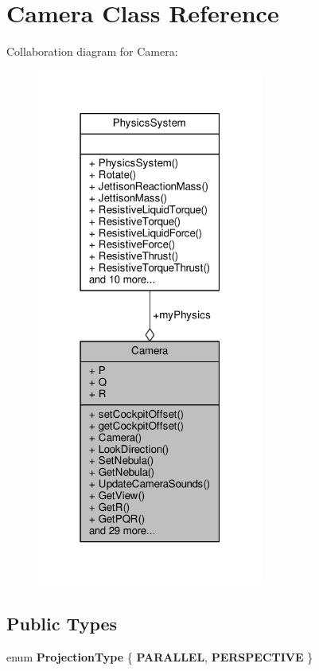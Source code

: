 \hypertarget{classCamera}{}\section{Camera Class Reference}
\label{classCamera}


Collaboration diagram for Camera\+:
\nopagebreak
\begin{figure}[H]
\begin{center}
\leavevmode
\includegraphics[width=211pt]{d4/ddb/classCamera__coll__graph}
\end{center}
\end{figure}
\subsection*{Public Types}
\begin{DoxyCompactItemize}
\item 
enum {\bfseries Projection\+Type} \{ {\bfseries P\+A\+R\+A\+L\+L\+EL}, 
{\bfseries P\+E\+R\+S\+P\+E\+C\+T\+I\+VE}
 \}\hypertarget{classCamera_ad98e4e57f3d6471357d0779c65613be1}{}\label{classCamera_ad98e4e57f3d6471357d0779c65613be1}

\end{DoxyCompactItemize}
